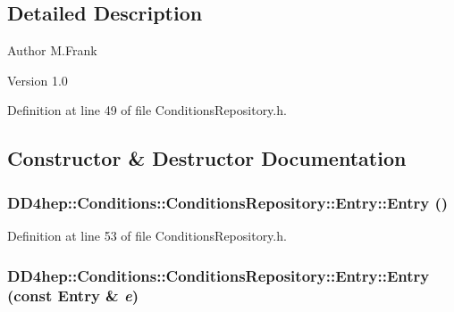 \subsection{Detailed Description}
\begin{DoxyAuthor}{Author}
M.Frank 
\end{DoxyAuthor}
\begin{DoxyVersion}{Version}
1.0 
\end{DoxyVersion}


Definition at line 49 of file ConditionsRepository.h.

\subsection{Constructor \& Destructor Documentation}
\hypertarget{class_d_d4hep_1_1_conditions_1_1_conditions_repository_1_1_entry_a4b5b7b66f05263698a5f95afacf50c2d}{
\subsubsection[{Entry}]{\setlength{\rightskip}{0pt plus 5cm}DD4hep::Conditions::ConditionsRepository::Entry::Entry ()}}
\label{class_d_d4hep_1_1_conditions_1_1_conditions_repository_1_1_entry_a4b5b7b66f05263698a5f95afacf50c2d}


Definition at line 53 of file ConditionsRepository.h.\hypertarget{class_d_d4hep_1_1_conditions_1_1_conditions_repository_1_1_entry_ae83cae74d588480e3e142c54fb198dc5}{
\subsubsection[{Entry}]{\setlength{\rightskip}{0pt plus 5cm}DD4hep::Conditions::ConditionsRepository::Entry::Entry (const {\bf Entry} \& {\em e})}}
\label{class_d_d4hep_1_1_conditions_1_1_conditions_repository_1_1_entry_ae83cae74d588480e3e142c54fb198dc5}


